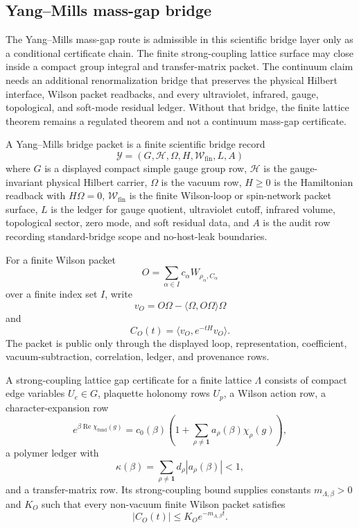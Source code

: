\subsection{Yang--Mills mass-gap bridge}
\label{subsec:philosophy-yang-mills-mass-gap-bridge}

The Yang--Mills mass-gap route is admissible in this scientific bridge layer
only as a conditional certificate chain. The finite strong-coupling lattice
surface may close inside a compact group integral and transfer-matrix packet.
The continuum claim needs an additional renormalization bridge that preserves
the physical Hilbert interface, Wilson packet readbacks, and every ultraviolet,
infrared, gauge, topological, and soft-mode residual ledger. Without that
bridge, the finite lattice theorem remains a regulated theorem and not a
continuum mass-gap certificate.

\begin{definition}
\label{def:philosophy-yang-mills-bridge-packet}
A Yang--Mills bridge packet is a finite scientific bridge record
$$
\mathcal Y=(G,\mathcal H,\Omega,H,\mathcal W_{\mathrm{fin}},L,A)
$$
where $G$ is a displayed compact simple gauge group row, $\mathcal H$ is the
gauge-invariant physical Hilbert carrier, $\Omega$ is the vacuum row,
$H\ge 0$ is the Hamiltonian readback with $H\Omega=0$,
$\mathcal W_{\mathrm{fin}}$ is the finite Wilson-loop or spin-network packet
surface, $L$ is the ledger for gauge quotient, ultraviolet cutoff, infrared
volume, topological sector, zero mode, and soft residual data, and $A$ is the
audit row recording standard-bridge scope and no-host-leak boundaries.
\end{definition}

\begin{definition}
\label{def:philosophy-finite-wilson-packet-correlation}
For a finite Wilson packet
$$
O=\sum_{\alpha\in I}c_{\alpha}W_{\rho_{\alpha},C_{\alpha}}
$$
over a finite index set $I$, write
$$
v_O=O\Omega-\langle\Omega,O\Omega\rangle\Omega
$$
and
$$
C_O(t)=\langle v_O,e^{-tH}v_O\rangle .
$$
The packet is public only through the displayed loop, representation,
coefficient, vacuum-subtraction, correlation, ledger, and provenance rows.
\end{definition}

\begin{definition}
\label{def:philosophy-strong-coupling-lattice-gap-certificate}
A strong-coupling lattice gap certificate for a finite lattice
$\Lambda$ consists of compact edge variables $U_e\in G$, plaquette holonomy
rows $U_p$, a Wilson action row, a character-expansion row
$$
e^{\beta\operatorname{Re}\chi_{\mathrm{fund}}(g)}
=
c_0(\beta)
\left(
1+
\sum_{\rho\ne\mathbf 1}a_{\rho}(\beta)\chi_{\rho}(g)
\right),
$$
a polymer ledger with
$$
\kappa(\beta)=\sum_{\rho\ne\mathbf 1}d_{\rho}|a_{\rho}(\beta)|<1,
$$
and a transfer-matrix row. Its strong-coupling bound supplies constants
$m_{\Lambda,\beta}>0$ and $K_O$ such that every non-vacuum finite Wilson
packet satisfies
$$
|C_O(t)|\le K_O e^{-m_{\Lambda,\beta}t}.
$$
\end{definition}

